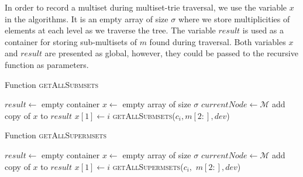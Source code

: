 In order to record a multiset during multiset-trie traversal, we use the variable $x$ in the algorithms.
It is an empty array of size $\sigma$ where we store multiplicities of elements at 
each level as we traverse the tree. The variable $result$ is used as a container for storing 
sub-multisets of $m$ found during traversal. Both variables $x$ and $result$ are presented 
as global, however, they could be passed to the recursive function as parameters.

\begin{algorithm}[h!]
\caption{Function \textsc{getAllSubmsets}}
\label{alg:getallsub}
\begin{algorithmic}[1]
\State $result \gets$ empty container
\State $x \gets$ empty array of size $\sigma$
\State $currentNode \gets \mathcal{M}$
\State add copy of $x$ to $result$ 
\EndIf
{}
\State $x[1]\gets i$
\State \textsc{getAllSubmsets}($c_i,m[2:], dev$)
\EndIf
\EndFor
\EndFunction
\end{algorithmic}
\end{algorithm}


\begin{algorithm}[h!]
\caption{Function \textsc{getAllSupermsets}}
\label{alg:getallsup}
\begin{algorithmic}[1]
\State $result \gets$ empty container
\State $x \gets$ empty array of size $\sigma$
\State $currentNode \gets \mathcal{M}$
\State add copy of $x$ to $result$ 
\EndIf
{}
\State $x[1]\gets i$
\textsc{getAllSupermsets}($c_i,$ $m[2:], dev$)
\EndIf
\EndFor
\EndFunction
\end{algorithmic}
\end{algorithm}